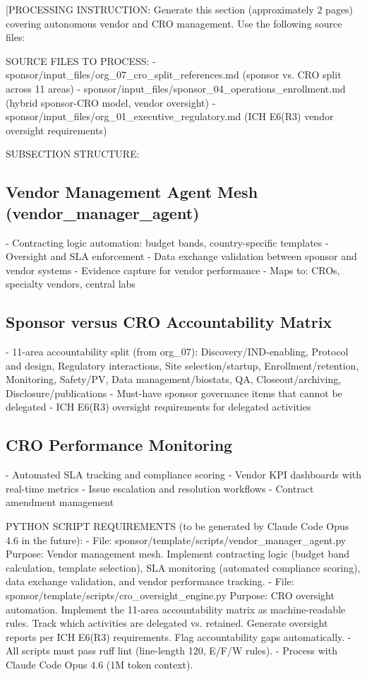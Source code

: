 
[PROCESSING INSTRUCTION: Generate this section (approximately 2 pages) covering autonomous
vendor and CRO management. Use the following source files:

SOURCE FILES TO PROCESS:
- sponsor/input\_files/org\_07\_cro\_split\_references.md (sponsor vs. CRO split across 11 areas)
- sponsor/input\_files/sponsor\_04\_operations\_enrollment.md (hybrid sponsor-CRO model, vendor oversight)
- sponsor/input\_files/org\_01\_executive\_regulatory.md (ICH E6(R3) vendor oversight requirements)

SUBSECTION STRUCTURE:

\subsection{Vendor Management Agent Mesh (vendor\_manager\_agent)}
- Contracting logic automation: budget bands, country-specific templates
- Oversight and SLA enforcement
- Data exchange validation between sponsor and vendor systems
- Evidence capture for vendor performance
- Maps to: CROs, specialty vendors, central labs

\subsection{Sponsor versus CRO Accountability Matrix}
- 11-area accountability split (from org\_07): Discovery/IND-enabling, Protocol and design,
  Regulatory interactions, Site selection/startup, Enrollment/retention, Monitoring,
  Safety/PV, Data management/biostats, QA, Closeout/archiving, Disclosure/publications
- Must-have sponsor governance items that cannot be delegated
- ICH E6(R3) oversight requirements for delegated activities

\subsection{CRO Performance Monitoring}
- Automated SLA tracking and compliance scoring
- Vendor KPI dashboards with real-time metrics
- Issue escalation and resolution workflows
- Contract amendment management

PYTHON SCRIPT REQUIREMENTS (to be generated by Claude Code Opus 4.6 in the future):
- File: sponsor/template/scripts/vendor\_manager\_agent.py
  Purpose: Vendor management mesh. Implement contracting logic (budget band
  calculation, template selection), SLA monitoring (automated compliance
  scoring), data exchange validation, and vendor performance tracking.
- File: sponsor/template/scripts/cro\_oversight\_engine.py
  Purpose: CRO oversight automation. Implement the 11-area accountability
  matrix as machine-readable rules. Track which activities are delegated
  vs. retained. Generate oversight reports per ICH E6(R3) requirements.
  Flag accountability gaps automatically.
- All scripts must pass ruff lint (line-length 120, E/F/W rules).
- Process with Claude Code Opus 4.6 (1M token context).

